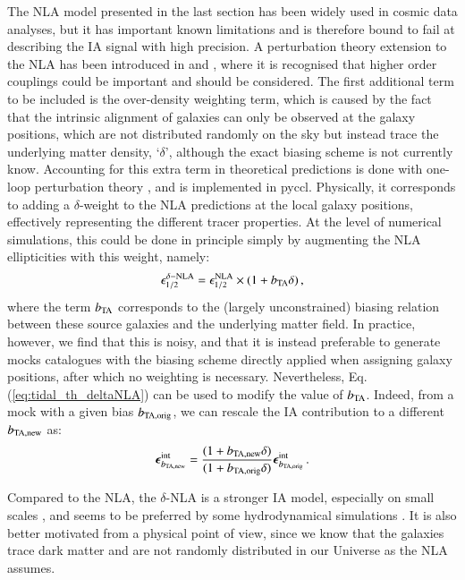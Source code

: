 \documentclass[useAMS,usenatbib]{mn2e}
\begin{document}
The NLA model presented in the last section has been widely used in cosmic data analyses, but it has important known limitations and is therefore bound to fail at describing the IA signal with high precision.
A perturbation theory extension to the NLA has been introduced in \citet{Blazek2015} and  \citet{Blazek2019},  where it is recognised that higher order couplings could be important and should be considered. The first additional term to be included is the over-density weighting term, which is caused by the fact that the intrinsic alignment of galaxies can only be observed at the galaxy positions, which are not distributed randomly on the sky but instead trace the underlying matter density,  `$\delta$', although the exact biasing scheme is not currently know. Accounting for this extra term in theoretical predictions is done with one-loop perturbation theory  \citep{Blazek2019}, and is implemented in {\sc pyccl}. Physically, it corresponds to adding a $\delta$-weight to the NLA predictions at the local galaxy positions, effectively representing the different tracer properties. At the level of numerical simulations, this could be done in principle simply by augmenting the NLA ellipticities with this weight, namely:
 \begin{eqnarray}
\epsilon_{1/2}^{\delta-\rm NLA} = \epsilon_{1/2}^{\rm NLA}\times(1 + b_{\rm TA}\delta) \, ,
\label{eq:tidal_th_deltaNLA}
\end{eqnarray}
where the term $b_{\rm TA}$ corresponds to the (largely unconstrained) biasing relation between these source galaxies and the underlying matter field. In practice, however, we find that this is noisy, and that it is instead preferable to generate mocks catalogues with the biasing scheme directly applied when assigning galaxy positions, after which no weighting is necessary. Nevertheless, Eq. (\ref{eq:tidal_th_deltaNLA}) can be used to modify the value of $b_{\rm TA}$. Indeed, from a mock with a given bias $b_{\rm TA, orig}$, we can rescale the IA contribution to a different $b_{\rm TA, new}$  as:
\begin{eqnarray}
{\boldsymbol \epsilon}^{\rm int}_{b_{\rm TA, new}}  = \frac{(1 + b_{\rm TA, new}\delta)}{(1 + b_{\rm TA, orig}\delta)}{\boldsymbol \epsilon}^{\rm int}_{b_{\rm TA, orig}} \, .
\label{eq:bta_rescale}
\end{eqnarray}


Compared to the NLA, the $\delta$-NLA is a stronger IA model, especially on small scales \citep{Blazek2019}, and seems to be preferred by some hydrodynamical simulations \citep{Hilbert_IA2017}. It is also better motivated from a physical point of view, since we know that the galaxies trace dark matter  and are not randomly distributed in our Universe as the NLA assumes.
\end{document}
